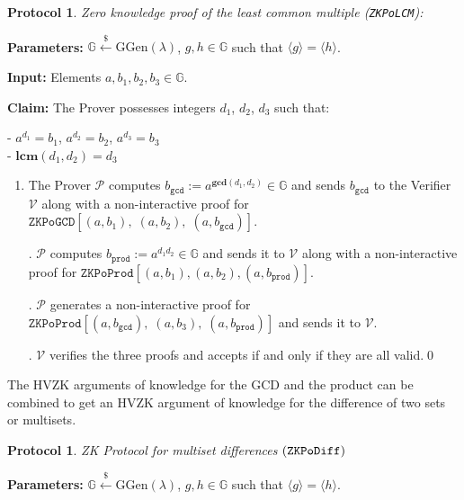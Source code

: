 \documentclass[11pt, lettersize, notitlepage, leqno, footskip=0.6cm]{article}
\newcommand{\ttt}{\texttt}
\newcommand{\bG}{\mathbb{G}}
\newcommand{\la}{\langle}
\newcommand{\ra}{\rangle}
\newcommand{\mc}{\mathcal}
\newcommand{\mb}{\mathbb}
\newcommand{\mbf}{\mathbf}
\newcommand{\mr}{\mathrm}
\newcommand{\lamb}{\lambda}
\newcommand{\mP}{\mc{P}}
\newcommand{\V}{\mc{V}}
\newcommand{\vs}{\vspace{-0.15cm}}
\newcommand{\noin}{\noindent}
\newcommand{\LCM}{\mbf{lcm}}
\newcommand{\GCD}{\mbf{gcd}}
\newtheorem{Prot}[Thm]{Protocol}
\numberwithin{equation}{section}
\begin{document}
\vspace{0.1cm}


\begin{Prot} \normalfont \hypertarget{LCM}{\textit{Zero knowledge proof of the least common multiple}} (\verb|ZKPoLCM|):\end{Prot} \vspace{-0.3cm}

\noin \textbf{Parameters:} $\mb{G}\xleftarrow{\$} \mr{GGen}(\lamb)$,  $g,h\in \mb{G}$ such that $\la g \ra = \la h \ra$.

\noin \textbf{Input:} Elements $a, b_1, b_2, b_3 \in \mb{G}$.

\noin \textbf{Claim:} The Prover possesses integers $d_1$, $d_2$, $d_3$ such that:

\noin - $a^{d_1} = b_1$, $a^{d_2} = b_2$, $a^{d_3} = b_3$\\
\noin - $\LCM(d_1, d_2) = d_3$
 

\begin{enumerate}[wide, labelwidth=!, labelindent=0pt]\vs \item The Prover $\mP$ computes $b_{\ttt{gcd}}:= a^{\GCD(d_1,d_2)}\in \bG$ and sends $b_{\ttt{gcd}}$ to the Verifier $\V$ along with a non-interactive proof for $\ttt{ZKPoGCD}[(a,b_1),\;(a,b_2),\;(a,b_{\ttt{gcd}})]$.

\noin 2. $\mP$ computes $b_{\ttt{prod}}:= a^{d_1d_2}\in \bG$ and sends it to $\V$ along with a non-interactive proof for $\ttt{ZKPoProd}[(a, b_1), (a, b_2), (a,b_{\ttt{prod}})]$.

\noin 3. $\mP$ generates a non-interactive proof for $\ttt{ZKPoProd}[(a, b_{\ttt{gcd}}),\;(a, b_3),\; (a,b_{\ttt{prod}})]$ and sends it to $\V$.

\noin 4. $\V$ verifies the three proofs and accepts if and only if they are all valid.\qed \end{enumerate}




\noin The HVZK arguments of knowledge for the GCD and the product can be combined to get an HVZK argument of knowledge for the difference of two sets or multisets.

\begin{Prot} ZK Protocol for multiset differences $(\tt{ZKPoDiff})$\end{Prot} \vspace{-0.3cm}

\noin \textbf{Parameters:} $\mb{G}\xleftarrow{\$} \mr{GGen}(\lamb)$,  $g,h\in \mb{G}$ such that $\la g \ra = \la h \ra$.
\end{document}
